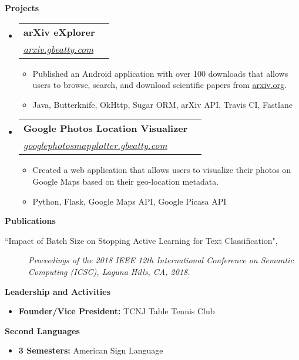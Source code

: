 \documentclass[letterpaper,10pt]{article}
\makeatletter
\newcommand{\resitem}[1]{\item #1 \vspace{-2pt}}
\newcommand{\resheading}[1]{{\large \colorbox{mygrey}{\begin{minipage}{\textwidth}{\textbf{#1 \vphantom{p\^{E}}}}\end{minipage}}}}
\newcommand{\ressubheading}[4]{
\begin{tabular*}{7.0in}{l@{\extracolsep{\fill}}r}
		\textbf{#1} & #2 \\
		\textit{#3} & \textit{#4} \\
\end{tabular*}\vspace{-6pt}}
\makeatother
\begin{document}
\resheading{Projects}
\begin{itemize}
\item
	\ressubheading{arXiv eXplorer}{}{\href{http://arxiv.gbeatty.com}{arxiv.gbeatty.com}}{}
	\begin{itemize}
		\resitem{Published an Android application with over 100 downloads that allows users to browse, search, and download scientific papers from \href{http://arxiv.org}{arxiv.org}.}
		\resitem{Java, Butterknife, OkHttp, Sugar ORM, arXiv API, Travis CI, Fastlane}
	\end{itemize}

\item
	\ressubheading{Google Photos Location Visualizer}{}{\href{http://googlephotosmapplotter.gbeatty.com}{googlephotosmapplotter.gbeatty.com}}{}
	\begin{itemize}
		\resitem{Created a web application that allows users to visualize their photos on Google Maps based on their geo-location metadata.}
		\resitem{Python, Flask, Google Maps API, Google Picasa API}
	\end{itemize}

\end{itemize}

\resheading{Publications}
\begin{description}
\item[``Impact of Batch Size on Stopping Active Learning for Text Classification",]
\emph{Proceedings of the 2018 IEEE 12th International Conference on Semantic Computing (ICSC), Laguna Hills, CA, 2018.}
\end{description}
\resheading{Leadership and Activities}
	\begin{itemize}
	\resitem{\textbf{Founder/Vice President:} TCNJ Table Tennis Club}
	\end{itemize}
\resheading{Second Languages}
	\begin{itemize}
	\resitem{\textbf{3 Semesters:} American Sign Language}
	\end{itemize}
\end{document}
